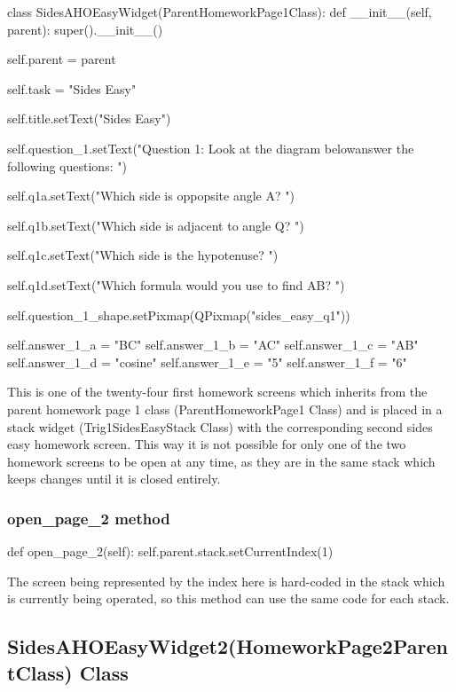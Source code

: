 \begin{python}
class SidesAHOEasyWidget(ParentHomeworkPage1Class):
    def __init__(self, parent):
        super().__init__()

        self.parent = parent

        self.task = "Sides Easy"
        
        self.title.setText("Sides Easy")

        self.question_1.setText("Question 1: Look at the diagram below\nand answer the following questions: ")
        
        self.q1a.setText("Which side is oppopsite angle A? ")
    
        self.q1b.setText("Which side is adjacent to angle Q? ")
                
        self.q1c.setText("Which side is the hypotenuse? ")        

        self.q1d.setText("Which formula would you use to find AB? ")
        
        self.question_1_shape.setPixmap(QPixmap("sides_easy_q1"))

        self.answer_1_a = "BC"
        self.answer_1_b = "AC"
        self.answer_1_c = "AB"
        self.answer_1_d = "cosine"
        self.answer_1_e = "5"
        self.answer_1_f = "6"
\end{python}

This is one of the twenty-four first homework screens which inherits from the parent homework page 1 class (ParentHomeworkPage1 Class) and is placed in a stack widget (Trig1SidesEasyStack Class) with the corresponding second sides easy homework screen. This way it is not possible for only one of the two homework screens to be open at any time, as they are in the same stack which keeps changes until it is closed entirely.

\subsubsection{open\_page\_2 method}

\begin{python}
def open_page_2(self):
        self.parent.stack.setCurrentIndex(1)
\end{python}

The screen being represented by the index here is hard-coded in the stack which is currently being operated, so this method can use the same code for each stack.

\subsection{SidesAHOEasyWidget2(HomeworkPage2ParentClass) Class}

